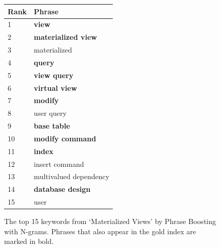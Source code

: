 \begin{figure}[!htbp]
\caption{The top 15 keywords from `Materialized Views' by Phrase
  Boosting with N-grams. Phrases that also appear in the gold index are marked in bold.}
\label{fig:top_15}
\begin{tabular}{|l|l|}
\hline
Rank & Phrase \\
\hline
1 & \textbf{view} \\
\hline
2 & \textbf{materialized view} \\
\hline
3 & materialized \\
\hline
4 & \textbf{query} \\
\hline
5 & \textbf{view query} \\
\hline
6 & \textbf{virtual view} \\
\hline
7 & \textbf{modify} \\
\hline
8 & user query \\
\hline
9 & \textbf{base table} \\
\hline
10 & \textbf{modify command} \\
\hline
11 & \textbf{index} \\
\hline
12 & insert command \\
\hline
13 & multivalued dependency \\
\hline
14 & \textbf{database design} \\
\hline
15 & user \\
\hline
\end{tabular}
\end{figure}

%
%
%
